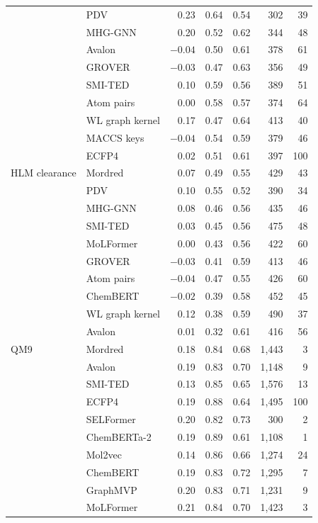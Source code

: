 {\begin{longtable}{llrrrrr}
 & PDV & 0.23 & 0.64 & 0.54 & 302 & 39 \\
 & MHG-GNN & 0.20 & 0.52 & 0.62 & 344 & 48 \\
 & Avalon & $-0.04$ & 0.50 & 0.61 & 378 & 61 \\
 & GROVER & $-0.03$ & 0.47 & 0.63 & 356 & 49 \\
 & SMI-TED & 0.10 & 0.59 & 0.56 & 389 & 51 \\
 & Atom pairs & 0.00 & 0.58 & 0.57 & 374 & 64 \\
 & WL graph kernel & 0.17 & 0.47 & 0.64 & 413 & 40 \\
 & MACCS keys & $-0.04$ & 0.54 & 0.59 & 379 & 46 \\
 & ECFP4 & 0.02 & 0.51 & 0.61 & 397 & 100 \\
\midrule
HLM clearance & Mordred & 0.07 & 0.49 & 0.55 & 429 & 43 \\
 & PDV & 0.10 & 0.55 & 0.52 & 390 & 34 \\
 & MHG-GNN & 0.08 & 0.46 & 0.56 & 435 & 46 \\
 & SMI-TED & 0.03 & 0.45 & 0.56 & 475 & 48 \\
 & MoLFormer & 0.00 & 0.43 & 0.56 & 422 & 60 \\
 & GROVER & $-0.03$ & 0.41 & 0.59 & 413 & 46 \\
 & Atom pairs & $-0.04$ & 0.47 & 0.55 & 426 & 60 \\
 & ChemBERT & $-0.02$ & 0.39 & 0.58 & 452 & 45 \\
 & WL graph kernel & 0.12 & 0.38 & 0.59 & 490 & 37 \\
 & Avalon & 0.01 & 0.32 & 0.61 & 416 & 56 \\
\midrule
QM9 & Mordred & 0.18 & 0.84 & 0.68 & 1,443 & 3 \\
 & Avalon & 0.19 & 0.83 & 0.70 & 1,148 & 9 \\
 & SMI-TED & 0.13 & 0.85 & 0.65 & 1,576 & 13 \\
 & ECFP4 & 0.19 & 0.88 & 0.64 & 1,495 & 100 \\
 & SELFormer & 0.20 & 0.82 & 0.73 & 300 & 2 \\
 & ChemBERTa-2 & 0.19 & 0.89 & 0.61 & 1,108 & 1 \\
 & Mol2vec & 0.14 & 0.86 & 0.66 & 1,274 & 24 \\
 & ChemBERT & 0.19 & 0.83 & 0.72 & 1,295 & 7 \\
 & GraphMVP & 0.20 & 0.83 & 0.71 & 1,231 & 9 \\
 & MoLFormer & 0.21 & 0.84 & 0.70 & 1,423 & 3 \\
\end{longtable}
}

